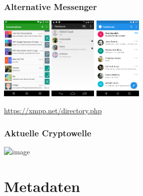 \documentclass[12pt, xcolor={svgnames,table}]{beamer}
\begin{document}
\begin{frame}
  \frametitle{Alternative Messenger}
    \begin{center}
      \includegraphics[height=4cm]{img/conversations.png}
      \hspace{0.5cm}
      \includegraphics[height=4cm]{img/chatsecure.png}
      \hspace{0.5cm}
      \includegraphics[height=4cm]{img/signal1.png}
    \end{center}
    \url{https://xmpp.net/directory.php}
\end{frame}

\begin{frame}
  \frametitle{Aktuelle Cryptowelle}
    \begin{center} 
      \includegraphics<1>[width=0.7\textwidth]{img/facebookgoogleencryption.png}
    \end{center}
\end{frame}

\section{Metadaten}
\subsection{}
\end{document}
